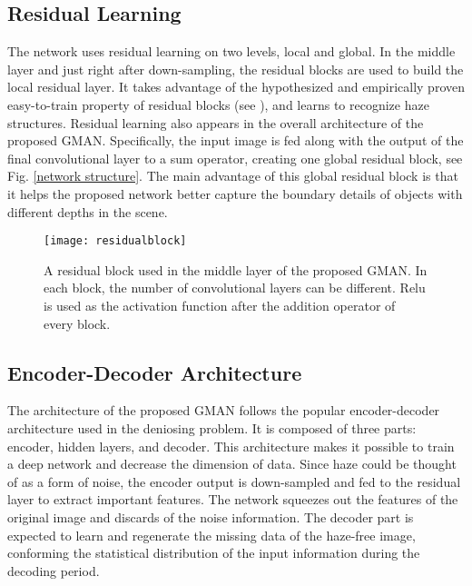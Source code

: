 \documentclass[journal]{IEEEtran}
\begin{document}
\subsection{Residual Learning}


The network uses residual learning on two levels, local and global. In the middle layer and just right after down-sampling, the residual blocks are used to build the local residual layer. It takes advantage of the hypothesized and empirically proven \cite{kim2016accurate,zhang2017beyond,szegedy2017inception,ren2017faster} easy-to-train property of residual blocks (see \cite{ResNet}), and learns to recognize haze structures. Residual learning also appears in the overall architecture of the proposed GMAN. Specifically, the input image is fed along with the output of the final convolutional layer to a sum operator, creating one global residual block, see Fig. \ref{network structure}. The main advantage of this global residual block is that it helps the proposed network better capture the boundary details of objects with different depths in the scene.

\begin{figure}
	\centering
 \texttt{[image: residualblock]}
	\captionsetup{justification=centering}
	\centering\caption{A residual block used in the middle layer of the proposed GMAN. In each block, the number of convolutional layers can be different. Relu is used as the activation function after the addition operator of every block.}
	\label{resblock}
\end{figure}

\subsection{Encoder-Decoder Architecture}

The architecture of the proposed GMAN follows the popular encoder-decoder architecture used in the deniosing problem. It is composed of three parts: encoder, hidden layers, and decoder. This architecture makes it possible to train a deep network and decrease the dimension of data. Since haze could be thought of as a form of noise, the encoder output is down-sampled and fed to the residual layer to extract important features. The network squeezes out the features of the original image and discards of the noise information. The decoder part is expected to learn and regenerate the missing data of the haze-free image, conforming the statistical distribution of the input information during the decoding period.
\end{document}

